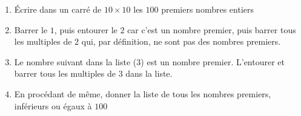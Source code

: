 
\begin{enumerate}
\item Écrire dans un carré de $10 \times 10$ les $100$ premiers nombres entiers
\item Barrer le $1$, puis entourer le $2$ car c'est un nombre premier, puis barrer tous les multiples de $2$ qui, par définition, ne sont pas des nombres premiers.
\item Le nombre suivant dans la liste ($3$) est un nombre premier. L'entourer et barrer tous les multiples de $3$ dans la liste.
\item En procédant de même, donner la liste de tous les nombres premiers, inférieurs ou égaux à $100$
\end{enumerate}




